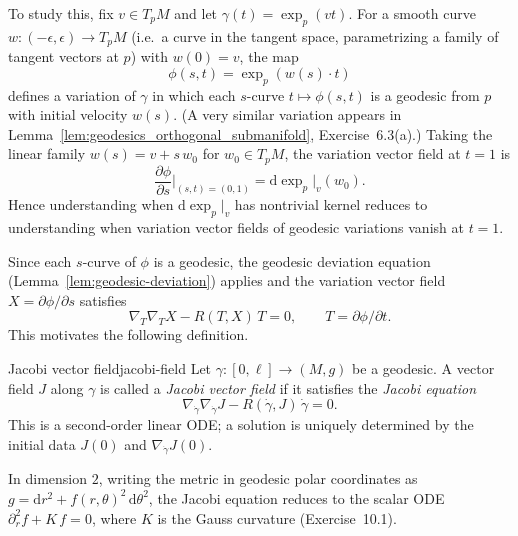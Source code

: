 To study this, fix $v \in T_p M$ and let $\gamma(t) = \exp_p(vt)$. For a smooth curve $w \colon (-\epsilon, \epsilon) \to T_p M$ (i.e.\ a curve in the tangent space, parametrizing a family of tangent vectors at $p$) with $w(0) = v$, the map
\[
\phi(s, t) = \exp_p(w(s) \cdot t)
\]
defines a variation of $\gamma$ in which each $s$-curve $t \mapsto \phi(s, t)$ is a geodesic from $p$ with initial velocity $w(s)$. (A very similar variation appears in Lemma~\ref{lem:geodesics_orthogonal_submanifold}, Exercise~6.3(a).) Taking the linear family $w(s) = v + s \, w_0$ for $w_0 \in T_p M$, the variation vector field at $t = 1$ is
\[
\frac{\partial \phi}{\partial s}\bigg|_{(s, t) = (0, 1)} = \mathrm{d}\exp_p\big|_v(w_0).
\]
Hence understanding when $\mathrm{d}\exp_p\big|_v$ has nontrivial kernel reduces to understanding when variation vector fields of geodesic variations vanish at $t = 1$.

Since each $s$-curve of $\phi$ is a geodesic, the geodesic deviation equation (Lemma~\ref{lem:geodesic-deviation}) applies and the variation vector field $X = \partial\phi/\partial s$ satisfies
\[
\nabla_T \nabla_T X - R(T, X)\, T = 0, \qquad T = \partial \phi / \partial t.
\]
This motivates the following definition.

\begin{colordef}{Jacobi vector field}{jacobi-field}
Let $\gamma \colon [0, \ell] \to (M, g)$ be a geodesic. A vector field $J$ along $\gamma$ is called a \emph{Jacobi vector field} if it satisfies the \emph{Jacobi equation}
\begin{equation}
    \label{eq:jacobi-equation}
    \nabla_{\dot\gamma} \nabla_{\dot\gamma} J - R(\dot\gamma, J)\, \dot\gamma = 0.
\end{equation}
This is a second-order linear ODE; a solution is uniquely determined by the initial data $J(0)$ and $\nabla_{\dot\gamma} J(0)$.
\end{colordef}
In dimension $2$, writing the metric in geodesic polar coordinates as $g = \mathrm{d}r^2 + f(r, \theta)^2\, \mathrm{d}\theta^2$, the Jacobi equation reduces to the scalar ODE $\partial_r^2 f + K\, f = 0$, where $K$ is the Gauss curvature (Exercise~10.1).






